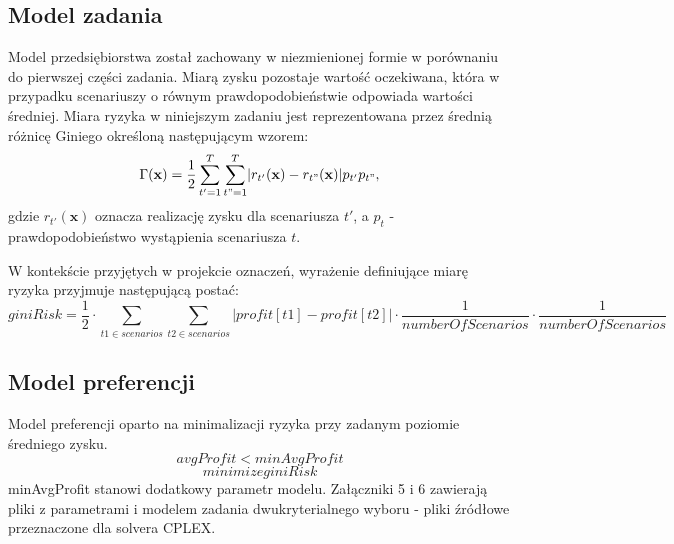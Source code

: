 \documentclass[11pt,a4paper]{article}
\begin{document}
\subsection{Model zadania}
Model przedsiębiorstwa został zachowany w niezmienionej formie w porównaniu do pierwszej części zadania. Miarą zysku pozostaje wartość oczekiwana, która w przypadku scenariuszy o równym prawdopodobieństwie odpowiada wartości średniej. Miara ryzyka w niniejszym zadaniu jest reprezentowana przez średnią różnicę Giniego określoną następującym wzorem:
\begin{equation}
\Gamma(\mathbf{x})=\frac{1}{2}\sum_{t'=1}^{T}\sum_{t"=1}^{T}\lvert r_{t'}(\mathbf{x})-r_{t"}(\mathbf{x})\rvert p_{t'}p_{t"}, 
\end{equation}
gdzie $r_{t'}(\mathbf{x})$ oznacza realizację zysku dla scenariusza $t'$, a $p_{t}$ - prawdopodobieństwo wystąpienia scenariusza $t$.

W kontekście przyjętych w projekcie oznaczeń, wyrażenie definiujące miarę ryzyka przyjmuje następującą postać:
\begin{equation}
giniRisk = \frac{1}{2}\cdot\sum_{t1 \in scenarios}\sum_{t2 \in scenarios} \lvert profit[t1]-profit[t2] \rvert \cdot \frac{1}{numberOfScenarios} \cdot \frac{1}{numberOfScenarios} 
\end{equation}

\subsection{Model preferencji}
Model preferencji oparto na minimalizacji ryzyka przy zadanym poziomie średniego zysku.
\begin{equation}
avgProfit<minAvgProfit
\end{equation}
\begin{equation}
minimize giniRisk
\end{equation}
minAvgProfit stanowi dodatkowy parametr modelu. Załączniki 5 i 6 zawierają pliki z parametrami i modelem zadania dwukryterialnego wyboru - pliki źródłowe przeznaczone dla solvera CPLEX. 
\end{document}
